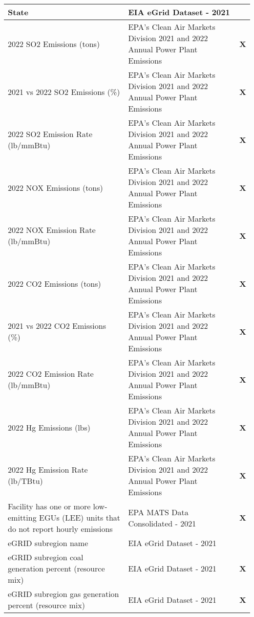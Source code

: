 \begin{table}[htb]
\begin{adjustbox}{width=\textwidth}
\begin{tabular}{|l | l | l |}
        \midrule
        State & EIA eGrid Dataset - 2021 & \\
        \midrule
        2022 SO2 Emissions (tons) & EPA's Clean Air Markets Division 2021 and 2022 Annual Power Plant Emissions & \textbf{X} \\
        \midrule
        2021 vs 2022 SO2 Emissions (\%) & EPA's Clean Air Markets Division 2021 and 2022 Annual Power Plant Emissions & \textbf{X} \\
        \midrule
        2022 SO2 Emission Rate (lb/mmBtu) & EPA's Clean Air Markets Division 2021 and 2022 Annual Power Plant Emissions & \textbf{X} \\
        \midrule
        2022 NOX Emissions (tons) & EPA's Clean Air Markets Division 2021 and 2022 Annual Power Plant Emissions & \textbf{X} \\
        \midrule
        2022 NOX Emission Rate (lb/mmBtu) & EPA's Clean Air Markets Division 2021 and 2022 Annual Power Plant Emissions & \textbf{X} \\
        \midrule
        2022 CO2 Emissions (tons) & EPA's Clean Air Markets Division 2021 and 2022 Annual Power Plant Emissions & \textbf{X} \\
        \midrule
        2021 vs 2022 CO2 Emissions (\%) & EPA's Clean Air Markets Division 2021 and 2022 Annual Power Plant Emissions & \textbf{X} \\
        \midrule
        2022 CO2 Emission Rate (lb/mmBtu) & EPA's Clean Air Markets Division 2021 and 2022 Annual Power Plant Emissions & \textbf{X} \\
        \midrule
        2022 Hg Emissions (lbs) & EPA's Clean Air Markets Division 2021 and 2022 Annual Power Plant Emissions & \textbf{X} \\
        \midrule
        2022 Hg Emission Rate (lb/TBtu) & EPA's Clean Air Markets Division 2021 and 2022 Annual Power Plant Emissions & \textbf{X} \\
        \midrule
        Facility has one or more low-emitting EGUs (LEE) units that do not report hourly emissions & EPA MATS Data Consolidated - 2021 & \textbf{X} \\
        \midrule
        eGRID subregion name & EIA eGrid Dataset - 2021 & \\
        \midrule
        eGRID subregion coal generation percent (resource mix) & EIA eGrid Dataset - 2021 & \textbf{X} \\
        \midrule
        eGRID subregion gas generation percent (resource mix) & EIA eGrid Dataset - 2021 & \textbf{X} \\

\end{tabular}
\end{adjustbox}
\end{table}
